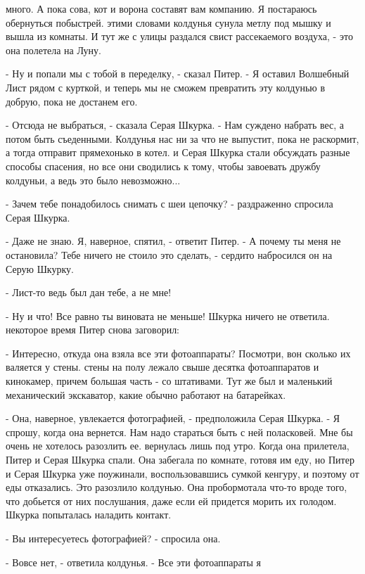 много. А пока сова, кот и ворона составят вам компанию. Я постараюсь 
обернуться побыстрей.
 этими словами колдунья сунула метлу под мышку и вышла из 
комнаты. И тут же с улицы раздался свист рассекаемого воздуха, - это 
она полетела на Луну.
\par- Ну и попали мы с тобой в переделку, - сказал Питер. - Я оставил 
Волшебный Лист рядом с курткой, и теперь мы не сможем превратить эту 
колдунью в добрую, пока не достанем его.
\par- Отсюда не выбраться, - сказала Серая Шкурка. - Нам суждено 
набрать вес, а потом быть съеденными. Колдунья нас ни за что не 
выпустит, пока не раскормит, а тогда отправит прямехонько в котел.
 и Серая Шкурка стали обсуждать разные способы спасения, но 
все они сводились к тому, чтобы завоевать дружбу колдуньи, а ведь это 
было невозможно...
\par- Зачем тебе понадобилось снимать с шеи цепочку? - раздраженно 
спросила Серая Шкурка.
\par- Даже не знаю. Я, наверное, спятил, - ответит Питер. - А почему 
ты меня не остановила? Тебе ничего не стоило это сделать, - сердито 
набросился он на Серую Шкурку.
\par- Лист-то ведь был дан тебе, а не мне!
\par- Ну и что! Все равно ты виновата не меньше!
 Шкурка ничего не ответила.
 некоторое время Питер снова заговорил:
\par- Интересно, откуда она взяла все эти фотоаппараты? Посмотри, вон 
сколько их валяется у стены.
 стены на полу лежало свыше десятка фотоаппаратов и кинокамер, 
причем большая часть - со штативами. Тут же был и маленький 
механический экскаватор, какие обычно работают на батарейках.
\par- Она, наверное, увлекается фотографией, - предположила Серая 
Шкурка. - Я спрошу, когда она вернется. Нам надо стараться быть с ней 
поласковей. Мне бы очень не хотелось разозлить ее.
 вернулась лишь под утро. Когда она прилетела, Питер и 
Серая Шкурка спали. Она забегала по комнате, готовя им еду, но Питер и 
Серая Шкурка уже поужинали, воспользовавшись сумкой кенгуру, и поэтому 
от еды отказались. Это разозлило колдунью. Она пробормотала что-то 
вроде того, что добьется от них послушания, даже если ей придется 
морить их голодом.
 Шкурка попыталась наладить контакт.
\par- Вы интересуетесь фотографией? - спросила она.
\par- Вовсе нет, - ответила колдунья. - Все эти фотоаппараты я 
